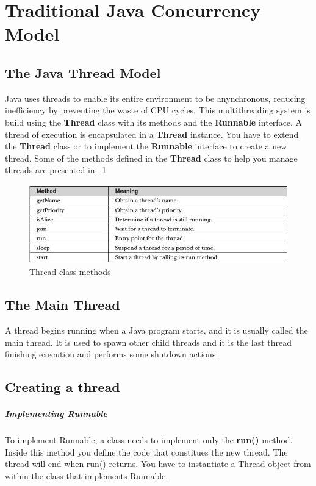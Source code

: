 \section{Traditional Java Concurrency Model}

\subsection{The Java Thread Model}

Java uses threads to enable its entire environment to be anynchronous, reducing inefficiency by preventing the waste of CPU cycles. This multithreading system is build using the \textbf{Thread} class with its methods and the \textbf{Runnable} interface. A thread of execution is encapsulated in a \textbf{Thread} instance. You have to extend the \textbf{Thread} class or to implement the \textbf{Runnable} interface to create a new thread. Some of the methods defined in the \textbf{Thread} class to help you manage threads are presented in ~\ref{fig:threadMethods} \cite{schildt2014}

\begin{figure}[th]
\centering
\includegraphics[scale=0.5]{Figures/threadMethods}
\decoRule
\caption{Thread class methods}
\label{fig:threadMethods}
\end{figure}

\subsection{The Main Thread}

A thread begins running when a Java program starts, and it is usually called the main thread. It is used to spawn other child threads and it is the last thread finishing execution and performs some shutdown actions.

\subsection{Creating a thread}

\subparagraph{Implementing Runnable}
To implement Runnable, a class needs to implement only the \textbf{run()} method. Inside this method you define the code that constitues the new thread. The thread will end when run() returns. You have to instantiate a Thread object from within the class that implements Runnable.

